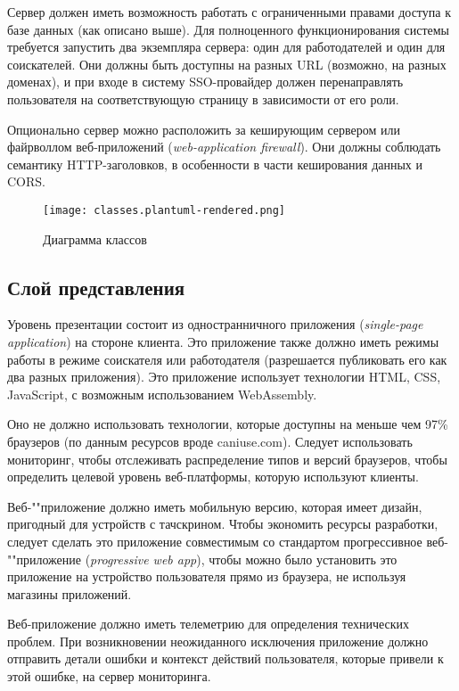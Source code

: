 \documentclass[a4page]{article}
\begin{document}
Сервер должен иметь возможность работать с ограниченными правами доступа к базе данных
(как описано выше).
Для полноценного функционирования системы требуется запустить два экземпляра сервера:
один для работодателей и один для соискателей.
Они должны быть доступны на разных URL
(возможно, на разных доменах),
и при входе в систему SSO-провайдер должен
перенаправлять пользователя на соответствующую страницу в зависимости от его роли.

Опционально сервер можно расположить за кеширующим сервером
или файрволлом веб-приложений (\textit{web-application firewall}).
Они должны соблюдать семантику HTTP-заголовков, в особенности в части кеширования данных и CORS.

\begin{figure}[H]
  \centering
  \texttt{[image: classes.plantuml-rendered.png]}
  \caption{Диаграмма классов}
\end{figure}

\subsection{Слой представления}

Уровень презентации состоит из одностранничного приложения
(\textit{single-page application}) на стороне клиента.
Это приложение также должно иметь режимы работы в режиме соискателя или работодателя
(разрешается публиковать его как два разных приложения).
Это приложение использует технологии HTML, CSS, JavaScript, с возможным использованием WebAssembly.

Оно не должно использовать технологии, которые доступны на меньше чем 97\% браузеров
(по данным ресурсов вроде caniuse.com).
Следует использовать мониторинг, чтобы отслеживать распределение типов и версий браузеров,
чтобы определить целевой уровень веб-платформы, которую используют клиенты.

Веб-""приложение должно иметь мобильную версию, которая имеет дизайн,
пригодный для устройств с тачскрином. Чтобы экономить ресурсы разработки,
следует сделать это приложение совместимым со стандартом
прогрессивное веб-""приложение (\textit{progressive web app}),
чтобы можно было установить это приложение на устройство пользователя
прямо из браузера, не используя магазины приложений.

Веб-приложение должно иметь телеметрию для определения технических проблем.
При возникновении неожиданного исключения приложение
должно отправить детали ошибки и контекст действий пользователя,
которые привели к этой ошибке, на сервер мониторинга.
\end{document}

